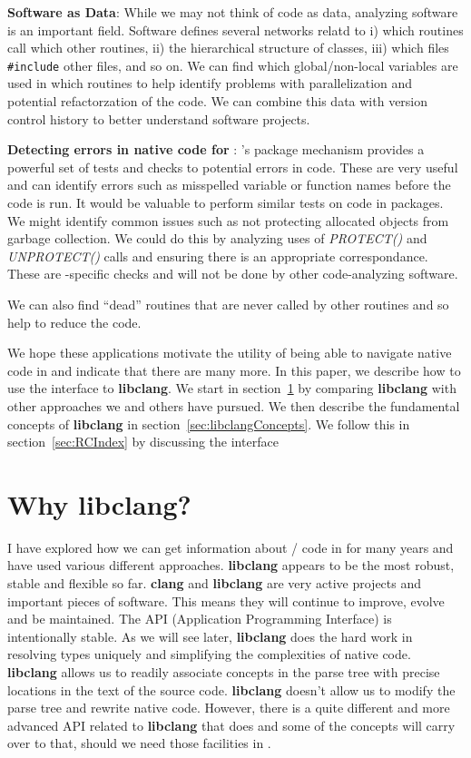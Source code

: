 \documentclass[article]{jss}
\def\C{\proglang{C}}
\def\Cpp{\proglang{C$++$}}
\def\R{\proglang{R}}
\def\Cfunc#1{\textit{#1()}}
\def\libclang{\textbf{libclang}}
\def\clang{\textbf{clang}}
\begin{document}
\textbf{Software as Data}: While we may not think of code as data,
analyzing software is an important field.  Software defines several
networks relatd to i) which routines call which other routines, ii)
the hierarchical structure of \Cpp{} classes, iii) which files
\texttt{\#include} other files, and so on.  We can find which
global/non-local variables are used in which routines to help identify
problems with parallelization and potential refactorzation of the
code.  We can combine this data with version control history to better
understand software projects.


\textbf{Detecting errors in native code for \R}: \R's package
mechanism provides a powerful set of tests and checks to potential
errors in \R{} code.  These are very useful and can identify errors
such as misspelled variable or function names before the code is run.
It would be valuable to perform similar tests on \C{} code in \R{}
packages.  We might identify common issues such as not protecting
allocated \R{} objects from garbage collection.  We could do this by
analyzing uses of \Cfunc{PROTECT} and \Cfunc{UNPROTECT} calls and
ensuring there is an appropriate correspondance.  These are
\R-specific checks and will not be done by other code-analyzing
software.


We can also find ``dead'' routines that are never called by other
routines and so help to reduce the code.

We hope these applications motivate the utility of being able to
navigate native code in \R and indicate that there are many more.  In
this paper, we describe how to use the \R{} interface to \libclang.
We start in section~\ref{sec:Whylibclang} by comparing \libclang{}
with other approaches we and others have pursued.  We then describe
the fundamental concepts of \libclang{} in
section~\ref{sec:libclangConcepts}.  We follow this in
section~\ref{sec:RCIndex} by discussing the \R{} interface


\section[Why libclang?]{Why \libclang?}\label{sec:Whylibclang}

I have explored how we can get information about \C/\Cpp{} code in
\R{} for many years and have used various different approaches.
\libclang{} appears to be the most robust, stable and flexible so far.
\clang{} and \libclang{} are very active projects and important pieces
of software. This means they will continue to improve, evolve and be
maintained.  The API (Application Programming Interface) is
intentionally stable.  As we will see later, \libclang{} does the hard
work in resolving types uniquely and simplifying the complexities of
native code.  \libclang{} allows us to readily associate concepts in
the parse tree with precise locations in the text of the source
code. \libclang{} doesn't allow us to modify the parse tree and
rewrite native code. However, there is a quite different and more
advanced API related to \libclang{} that does and some of the concepts
will carry over to that, should we need those facilities in \R.
\end{document}

